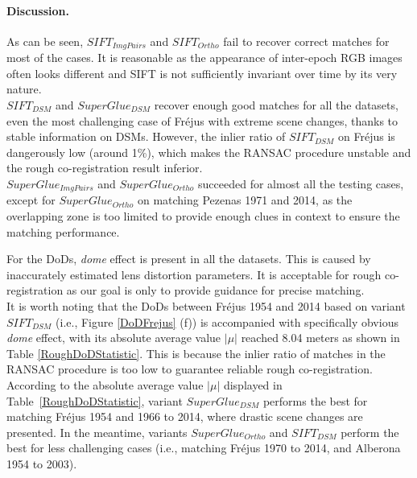 \paragraph{Discussion.} 
\label{para:Discussion}
As can be seen, $SIFT_{ImgPairs}$ and $SIFT_{Ortho}$ fail to recover correct matches for most of the cases. It is reasonable as the appearance of inter-epoch RGB images often looks different and SIFT is not sufficiently invariant over time by its very nature. \\
$SIFT_{DSM}$ and $SuperGlue_{DSM}$ recover enough good matches for all the datasets, even the most challenging case of Fr{\'e}jus with extreme scene changes, thanks to stable information on \ac{DSM}s. However, the inlier ratio of $SIFT_{DSM}$ on Fr{\'e}jus is dangerously low (around 1\%), which makes the RANSAC procedure unstable and the rough co-registration result inferior. \\
$SuperGlue_{ImgPairs}$ and $SuperGlue_{Ortho}$ succeeded for almost all the testing cases, except for $SuperGlue_{Ortho}$ on matching Pezenas 1971 and 2014, as the overlapping zone is too limited to provide enough clues in context to ensure the matching performance.\\
\par
For the \ac{DoD}s, \textit{dome} effect is present in all the datasets. %
This is caused by inaccurately estimated lens distortion parameters.
It is acceptable for rough co-registration as our goal is only to provide guidance for precise matching. \\
It is worth noting that the \ac{DoD}s between Fr{\'e}jus 1954 and 2014 based on variant $SIFT_{DSM}$ (i.e., Figure \ref{DoDFrejus} (f)) is accompanied with specifically obvious \textit{dome} effect, with its absolute average value $|\mu|$ reached 8.04 meters as shown in Table \ref{RoughDoDStatistic}. This is because the inlier ratio of matches in the RANSAC procedure is too low to guarantee reliable rough co-registration. According to the absolute average value $|\mu|$ displayed in Table~\ref{RoughDoDStatistic}, variant $SuperGlue_{DSM}$ performs the best for matching Fr{\'e}jus 1954 and 1966 to 2014, where drastic scene changes are presented. In the meantime, variants $SuperGlue_{Ortho}$ and $SIFT_{DSM}$ perform the best for less challenging cases (i.e., matching Fr{\'e}jus 1970 to 2014, and Alberona 1954 to 2003). %


